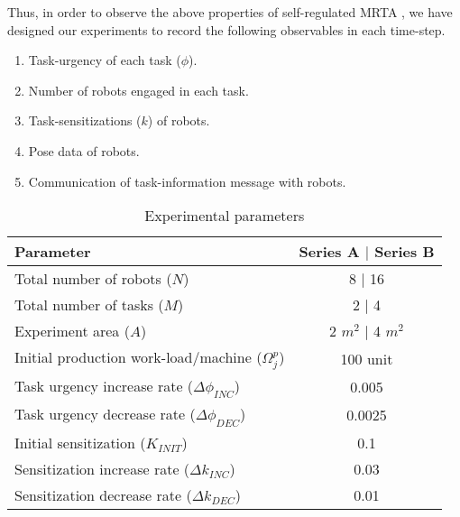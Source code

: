 Thus, in order to observe the above properties of self-regulated MRTA , we have designed our experiments to record the following  observables in each time-step.
\begin{enumerate}
\item Task-urgency of each task ($\phi$).
\item Number of robots engaged in each task.
\item Task-sensitizations ($k$) of robots.
\item Pose data of robots.
\item Communication of task-information message with robots.  
\end{enumerate}
\begin{table}
\caption{Experimental parameters}
\label{table:params}
\begin{center}
\begin{tabular}{|l|c|}
\hline Parameter & Series A $\mid$ Series B\\
\hline Total number of robots ($N$) & \hspace*{0.1cm} 8 $\mid$ 16\\
\hline Total number of tasks ($M$) & 2 $\mid$ 4\\
\hline Experiment area ($A$) & 2 $m^2$ $\mid$  4 $m^2$\\
\hline Initial production work-load/machine ($\Omega_{j}^{p}$) & 100 unit \\
\hline Task urgency increase rate ($\Delta\phi_{INC}$) & 0.005\\
\hline Task urgency decrease rate ($\Delta\phi_{DEC}$) & 0.0025\\
\hline Initial sensitization ($K_{INIT}$) & 0.1\\
\hline Sensitization increase rate ($\Delta k_{INC}$) & 0.03\\
\hline Sensitization decrease rate ($\Delta k_{DEC}$) & 0.01\\
\hline
\end{tabular}
\end{center}
\end{table}
